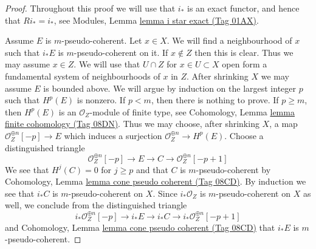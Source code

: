 \documentclass{amsart}
\theoremstyle{plain}
\theoremstyle{definition}
\theoremstyle{remark}
\numberwithin{equation}{subsection}
\begin{document}
\begin{proof}
Throughout this proof we will use that $i_*$ is an exact functor, and
hence that $Ri_* = i_*$, see Modules, Lemma \href{https://stacks.math.columbia.edu/tag/01AX}{lemma i star exact (Tag 01AX)}.

\medskip\noindent
Assume $E$ is $m$-pseudo-coherent. Let $x \in X$. We will find a neighbourhood
of $x$ such that $i_*E$ is $m$-pseudo-coherent on it. If $x \not \in Z$
then this is clear. Thus we may assume $x \in Z$. We will use
that $U \cap Z$ for $x \in U \subset X$ open form a fundamental system of
neighbourhoods of $x$ in $Z$. After shrinking $X$ we may assume $E$ is
bounded above. We will argue by induction on
the largest integer $p$ such that $H^p(E)$ is nonzero. If $p < m$, then
there is nothing to prove. If $p \geq m$, then $H^p(E)$ is an
$\mathcal{O}_Z$-module of finite type, see
Cohomology, Lemma \href{https://stacks.math.columbia.edu/tag/08DN}{lemma finite cohomology (Tag 08DN)}.
Thus we may choose, after shrinking $X$, a map
$\mathcal{O}_Z^{\oplus n}[-p] \to E$ which induces a surjection
$\mathcal{O}_Z^{\oplus n} \to H^p(E)$. Choose a distinguished triangle
$$
\mathcal{O}_Z^{\oplus n}[-p] \to E \to C \to \mathcal{O}_Z^{\oplus n}[-p + 1]
$$
We see that $H^j(C) = 0$ for $j \geq p$ and that $C$ is $m$-pseudo-coherent
by Cohomology, Lemma \href{https://stacks.math.columbia.edu/tag/08CD}{lemma cone pseudo coherent (Tag 08CD)}.
By induction we see that $i_*C$ is $m$-pseudo-coherent on $X$.
Since $i_*\mathcal{O}_Z$ is $m$-pseudo-coherent on $X$ as well, we conclude
from the distinguished triangle
$$
i_*\mathcal{O}_Z^{\oplus n}[-p] \to i_*E \to i_*C \to
i_*\mathcal{O}_Z^{\oplus n}[-p + 1]
$$
and 
Cohomology, Lemma \href{https://stacks.math.columbia.edu/tag/08CD}{lemma cone pseudo coherent (Tag 08CD)}
that $i_*E$ is $m$-pseudo-coherent.


\end{proof}
\end{document}
